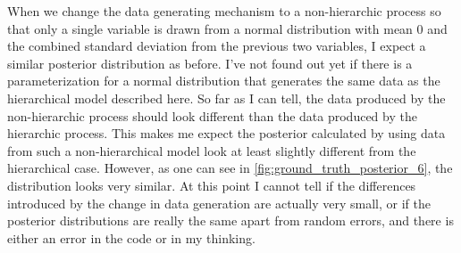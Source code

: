 \documentclass{article}
\begin{document}

When we change the data generating mechanism to a non-hierarchic process so that only a single variable is drawn from a normal distribution with mean 0 and the combined standard deviation from the previous two variables, I expect a similar posterior distribution as before. I've not found out yet if there is a parameterization for a normal distribution that generates the same data as the hierarchical model described here. So far as I can tell, the data produced by the non-hierarchic process should look different than the data produced by the hierarchic process. This makes me expect the posterior calculated by using data from such a non-hierarchical model look at least slightly different from the hierarchical case. However, as one can see in \autoref{fig:ground_truth_posterior_6}, the distribution looks very similar. At this point I cannot tell if the differences introduced by the change in data generation are actually very small, or if the posterior distributions are really the same apart from random errors, and there is either an error in the code or in my thinking.
\end{document}
